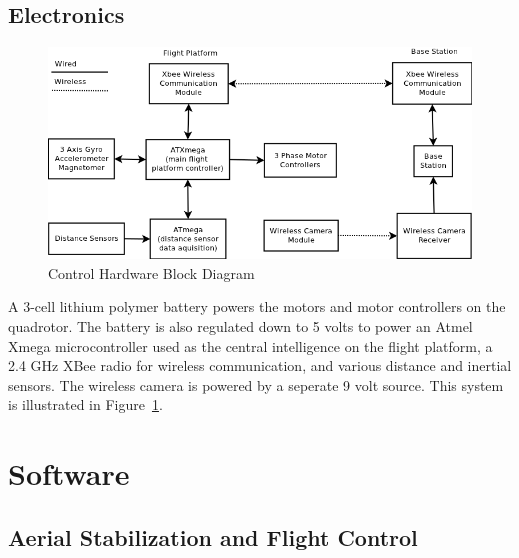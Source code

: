 \documentclass[12pt,letterpaper]{article}
\begin{document}
\subsection*{Electronics}

\begin{figure}[h!]
    \includegraphics[width=6in]{controlhardware.png}
    \caption{Control Hardware Block Diagram}
    \label{fig:el_blockdia}
\end{figure}

A 3-cell lithium polymer battery powers the motors and motor controllers on the
quadrotor. The battery is also regulated down to 5 volts to power an Atmel
Xmega microcontroller used as the central intelligence on the flight platform,
a 2.4 GHz XBee radio for wireless communication, and various distance and
inertial sensors. The wireless camera is powered by a seperate 9 volt source. This system is illustrated in Figure~\ref{fig:el_blockdia}.


\section*{Software}

\subsection*{Aerial Stabilization and Flight Control}

\end{document}
